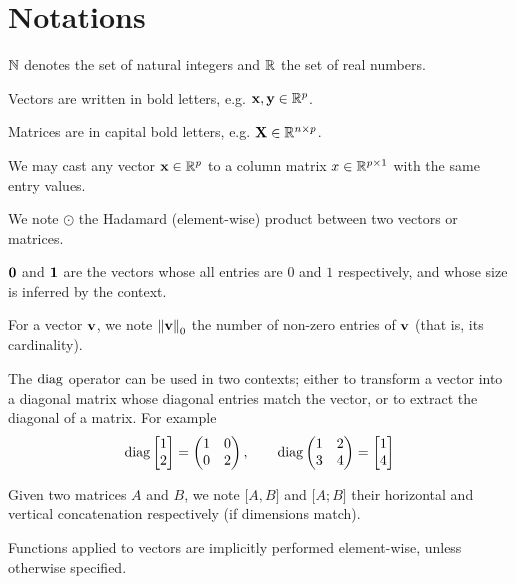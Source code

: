 \cleardoublepage
\chapter*{Notations}

$\mathbb{N}$ denotes the set of natural integers and $\mathbb{R}$ the set of real numbers.

Vectors are written in bold letters, e.g. $\mathbf{x}, \mathbf{y} \in \mathbb{R}^p$.

Matrices are in capital bold letters, e.g. $\mathbf{X} \in \mathbb{R}^{n \times p}$.

We may cast any vector $\mathbf{x} \in \mathbb{R}^p$ to a column matrix $x \in \mathbb{R}^{p \times 1}$ with the same entry values.

We note $\odot$ the Hadamard (element-wise) product between two vectors or matrices.

$\mathbf{0}$ and $\mathbf{1}$ are the vectors whose all entries are $0$ and $1$ respectively, and whose size is inferred by the context.

For a vector $\mathbf{v}$, we note $\left\lVert\mathbf{v}\right\rVert_0$ the number of non-zero entries of $\mathbf{v}$ (that is, its cardinality).

The $\operatorname*{diag}$ operator can be used in two contexts;
either to transform a vector into a diagonal matrix whose diagonal entries match the vector,
or to extract the diagonal of a matrix.
For example
\begin{equation*}
    \diag \begin{bmatrix}
         1\\
         2
    \end{bmatrix}
    =
    \left(\begin{array}{@{}cc@{}}
        1 & 0\\
        0 & 2
    \end{array}\right)
    ,\qquad
    \diag \left(\begin{array}{@{}cc@{}}
        1 & 2\\
        3 & 4
    \end{array}\right)
    =
    \begin{bmatrix}
         1\\
         4
    \end{bmatrix}
\end{equation*}

Given two matrices $A$ and $B$, we note $\big[ A, B \big]$ and $\big[ A; B \big]$ their horizontal and
vertical concatenation respectively (if dimensions match).

Functions applied to vectors are implicitly performed element-wise, unless otherwise specified.
